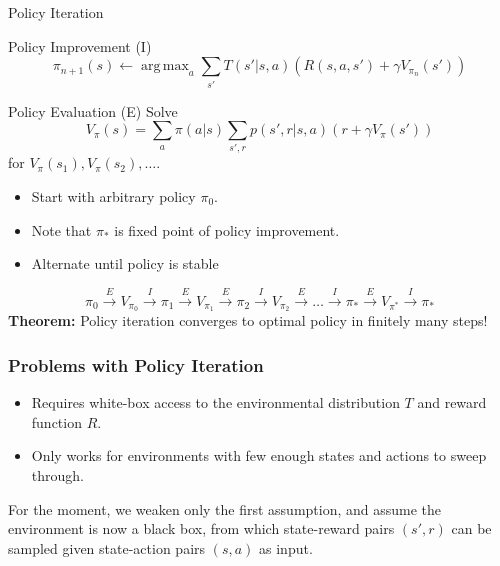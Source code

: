 \documentclass[10pt,a4paper]{beamer}
\DeclareMathOperator*{\argmax}{arg\,max}
\newcommand{\iter}{\xrightarrow{I}}
\newcommand{\eval}{\xrightarrow{E}}
\begin{document}
\begin{frame}{Policy Iteration}

\begin{block}{Policy Improvement (I)}
	$$
	\pi_{n+1}(s) \leftarrow \argmax_a \sum_{s'} T(s' | s,a) 
	\left( R(s,a,s') + \gamma V_{\pi_n}(s') \right)
	$$
\end{block}

	\begin{block}{Policy Evaluation (E)}
	Solve
	$$
	V_\pi(s) = \sum_{a} \pi(a | s) \sum_{s', r} p(s', r | s, a) \left( r + \gamma V_\pi(s') \right) 
	$$ for $V_\pi(s_1), V_\pi(s_2), \ldots$.
\end{block}

\pause
\begin{itemize}
	\item Start with arbitrary policy $\pi_0$.
	\pause
	\item Note that $\pi_*$ is fixed point of policy improvement.
	\pause
	\item Alternate until policy is stable
\end{itemize}
\pause
$$
\pi_0 \eval V_{\pi_0} \iter \pi_1 \eval V_{\pi_1} \eval \pi_2 \iter V_{\pi_2}
\eval \ldots \iter \pi_* \eval V_{\pi^*} \iter \pi_* 
$$
\pause
\textbf{Theorem:} Policy iteration converges to optimal policy in finitely 
many steps!
\end{frame}


	
\begin{frame}
\frametitle{Problems with Policy Iteration}

\begin{itemize}
	\item Requires white-box access to the environmental distribution $T$
	and reward function $R$.
	\item Only works for environments with few enough states and actions
	to sweep through.
\end{itemize}
	\pause
For the moment, we weaken only the first assumption, and assume the environment
is now a black box, from which state-reward pairs $(s',r)$ can be sampled
given state-action pairs $(s,a)$ as input.

\end{frame}
\end{document}
